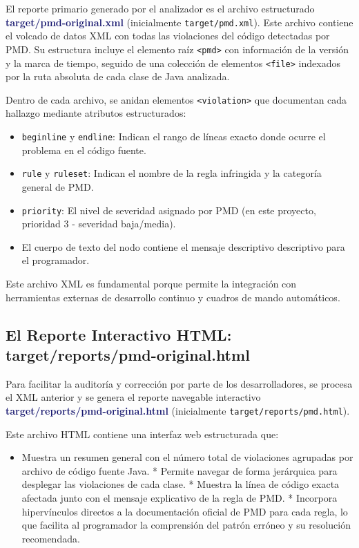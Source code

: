 \documentclass[12pt,a4paper]{article}
\newcommand{\key}[1]{\textbf{\textcolor{MidnightBlue}{#1}}}
\begin{document}
El reporte primario generado por el analizador es el archivo estructurado \key{target/pmd-original.xml} (inicialmente \texttt{target/pmd.xml}). Este archivo contiene el volcado de datos XML con todas las violaciones del código detectadas por PMD. Su estructura incluye el elemento raíz \texttt{<pmd>} con información de la versión y la marca de tiempo, seguido de una colección de elementos \texttt{<file>} indexados por la ruta absoluta de cada clase de Java analizada. 

Dentro de cada archivo, se anidan elementos \texttt{<violation>} que documentan cada hallazgo mediante atributos estructurados:
\begin{itemize}
    \item \texttt{beginline} y \texttt{endline}: Indican el rango de líneas exacto donde ocurre el problema en el código fuente.
    \item \texttt{rule} y \texttt{ruleset}: Indican el nombre de la regla infringida y la categoría general de PMD.
    \item \texttt{priority}: El nivel de severidad asignado por PMD (en este proyecto, prioridad 3 - severidad baja/media).
    \item El cuerpo de texto del nodo contiene el mensaje descriptivo descriptivo para el programador.
\end{itemize}

Este archivo XML es fundamental porque permite la integración con herramientas externas de desarrollo continuo y cuadros de mando automáticos.

\subsection{El Reporte Interactivo HTML: target/reports/pmd-original.html}

Para facilitar la auditoría y corrección por parte de los desarrolladores, se procesa el XML anterior y se genera el reporte navegable interactivo \key{target/reports/pmd-original.html} (inicialmente \texttt{target/reports/pmd.html}). 

Este archivo HTML contiene una interfaz web estructurada que:
\begin{itemize}
    \item Muestra un resumen general con el número total de violaciones agrupadas por archivo de código fuente Java.
    * Permite navegar de forma jerárquica para desplegar las violaciones de cada clase.
    * Muestra la línea de código exacta afectada junto con el mensaje explicativo de la regla de PMD.
    * Incorpora hipervínculos directos a la documentación oficial de PMD para cada regla, lo que facilita al programador la comprensión del patrón erróneo y su resolución recomendada.
\end{itemize}
\end{document}
